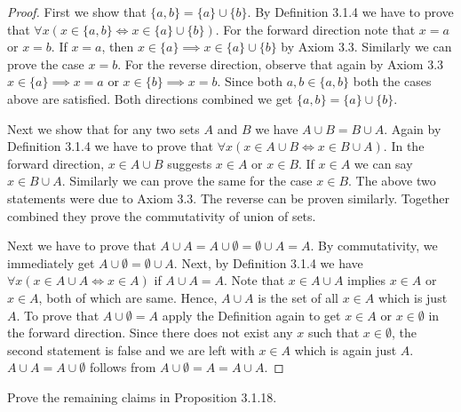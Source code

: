 \documentclass[12pt]{article}
\theoremstyle{remark}
\newcommand{\exercise}[1]{\noindent {\bf Exercise #1.}}
\newenvironment{ques}[1][]{%
	\begin{mdframed}[style=mdblackbox]
		\exercise{#1}
}{%
\end{mdframed}
}
\begin{document}
\begin{proof}
	First we show that $ \{ a, b \} = \{ a \} \cup \{ b \}$. By Definition 3.1.4 we have to prove that $ \forall x (x \in \{ a, b \} \iff x \in \{ a \} \cup \{ b \} ) $. For the forward direction note that $ x = a $ or $ x = b $. If $ x = a $, then $ x \in \{ a \} \implies x \in \{ a \} \cup \{ b \} $ by Axiom 3.3. Similarly we can prove the case $ x = b $. For the reverse direction, observe that again by Axiom 3.3 $ x \in \{ a \} \implies x = a $ or $ x \in \{ b \} \implies x = b $. Since both $ a, b \in \{ a, b \} $ both the cases above are satisfied. Both directions combined we get $ \{ a, b \} = \{ a \} \cup \{ b \}$. \par
	Next we show that for any two sets $ A $ and $ B $ we have $ A \cup B = B \cup A $. Again by Definition 3.1.4 we have to prove that $ \forall x (x \in A \cup B \iff x \in B \cup A) $. In the forward direction, $ x \in A \cup B $ suggests $ x \in A $ or $ x \in B $. If $ x \in A $ we can say $ x \in B \cup A $. Similarly we can prove the same for the case $ x \in B $. The above two statements were due to Axiom 3.3. The reverse can be proven similarly. Together combined they prove the commutativity of union of sets. \par
	Next we have to prove that $ A \cup A = A \cup \emptyset = \emptyset \cup A = A $. By commutativity, we immediately get $ A \cup \emptyset = \emptyset \cup A $. Next, by Definition 3.1.4 we have $ \forall x (x \in A \cup A \iff x \in A) $ if $ A \cup A = A $. Note that $ x \in A \cup A $ implies $ x \in A $ or $ x \in A $, both of which are same. Hence, $ A \cup A $ is the set of all $ x \in A $ which is just $ A $. To prove that $ A \cup \emptyset = A $ apply the Definition again to get $ x \in A $ or $ x \in \emptyset $ in the forward direction. Since there does not exist any $ x $ such that $ x \in \emptyset $, the second statement is false and we are left with $ x \in A $ which is again just $ A $. $ A \cup A = A \cup \emptyset $ follows from $ A \cup \emptyset = A = A \cup A $.   
\end{proof}

\begin{ques}[3.1.4]
    Prove the remaining claims in Proposition 3.1.18.
\end{ques}
\end{document}
